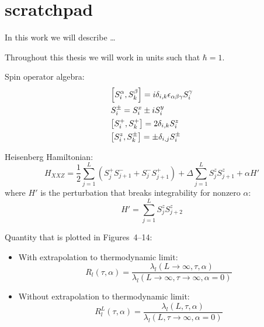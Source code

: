 \chapter{scratchpad}
\thispagestyle{chapterBeginStyle}

In this work we will describe \ldots~\autocite{Mierzejewski2015a}

Throughout this thesis we will work in units such that \(\hbar = 1\).

Spin operator algebra:
\begin{align*}
    &\comm{S_{i}^{\alpha}}{S_{k}^{\beta}} = i  \delta_{i,k}\epsilon_{\alpha \beta \gamma} S_{i}^{\gamma}\\
    &S_{i}^{\pm} = \Sx_i \pm i \Sy_i\\
    &\comm{\Sp_i}{\Sp_k} = 2 \delta_{i,k} \Sz_i \\
    &\comm{\Sz_i}{S^{\pm}_k} = \pm \delta_{i,j} S_{i}^{\pm}
\end{align*}

\noindent Heisenberg Hamiltonian:
\begin{equation}
    H_{XXZ} = \frac{1}{2}\sum_{j = 1}^{L}\left( S^{+}_{j} S^{-}_{j+1} + S^{-}_{j}S^{+}_{j+1} \right) + \Delta\sum_{j = 1}^{L} S^{z}_{j}S^{z}_{j+1}
    + \alpha H'
    \label{eq:HXXZ}
\end{equation}
where \(H'\) is the perturbation that breaks integrability for nonzero \(\alpha\):
\begin{equation}
    H'=\sum_{j = 1}^{L} S^{z}_{j}S^{z}_{j+2}
\end{equation}


\noindent Quantity that is plotted in Figures~4--14:
\begin{itemize}
    \item 
    With extrapolation to thermodynamic limit:
    \begin{equation}
        R_l(\tau,\alpha) = \frac{\lambda_l(L\rightarrow \infty,\tau,\alpha)}
        {\lambda_l(L\rightarrow \infty,\tau \rightarrow \infty,\alpha=0)}
        \label{eq:R1 extrap}
    \end{equation}
    \item
    Without extrapolation to thermodynamic limit:
    \begin{equation}
        R^L_l(\tau,\alpha) = \frac{\lambda_l(L,\tau,\alpha)}
        {\lambda_l(L,\tau \rightarrow \infty,\alpha=0)}
        \label{eq:R1 no extrap}
    \end{equation}
\end{itemize}


